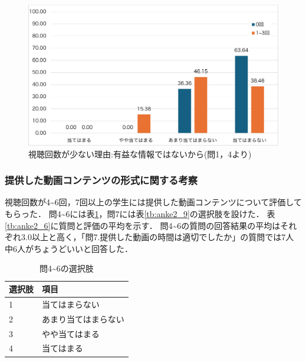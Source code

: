 \documentclass[12pt,a4j,titlepage]{ltjsarticle}
\begin{document}
\begin{figure}[!htb]
\centering
    \centering
    \includegraphics[width=1.0\columnwidth]{有益な情報ではないから.pdf}
    \caption{視聴回数が少ない理由:有益な情報ではないから(問1，4より)}
    \label{fig:yuueki}
\end{figure}

\clearpage

\subsubsection{提供した動画コンテンツの形式に関する考察}

視聴回数が4\textasciitilde6回，7回以上の学生には提供した動画コンテンツについて評価してもらった．
問4\textasciitilde6には表\ref{tb:anke2_5}，問7には表\ref{tb:anke2_9}の選択肢を設けた．
表\ref{tb:anke2_6}に質問と評価の平均を示す．
問4\textasciitilde6の質問の回答結果の平均はそれぞれ3.0以上と高く，「問7.提供した動画の時間は適切でしたか」の質問では7人中6人がちょうどいいと回答した．

\begin{table}[htbp]
  \caption{問4\textasciitilde6の選択肢}
  \begin{center}
\begin{tabular}{ll}\hline
選択肢 & 項目\\ \hline
               1 & 当てはまらない \\ 
               2 & あまり当てはまらない\\
               3 & やや当てはまる\\
               4 & 当てはまる\\
              \hline
               \end{tabular}
               \end{center}
               \label{tb:anke2_5}
               \end{table}
\end{document}
